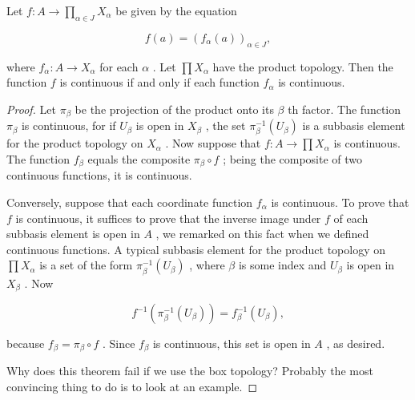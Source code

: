 \begin{theorem} Let \(f : A \rightarrow  \mathop{\prod }\limits_{{\alpha  \in  J}}{X}_{\alpha }\) be given by the equation

\[
f\left( a\right)  = {\left( {f}_{\alpha }\left( a\right) \right) }_{\alpha  \in  J},
\]

where \({f}_{\alpha } : A \rightarrow  {X}_{\alpha }\) for each \(\alpha\) . Let \(\prod {X}_{\alpha }\) have the product topology. Then the function \(f\) is continuous if and only if each function \({f}_{\alpha }\) is continuous.

\end{theorem}
\begin{proof}
Let \({\pi }_{\beta }\) be the projection of the product onto its \(\beta\) th factor. The function \({\pi }_{\beta }\) is continuous, for if \({U}_{\beta }\) is open in \({X}_{\beta }\) , the set \({\pi }_{\beta }^{-1}\left( {U}_{\beta }\right)\) is a subbasis element for the product topology on \({X}_{\alpha }\) . Now suppose that \(f : A \rightarrow  \prod {X}_{\alpha }\) is continuous. The function \({f}_{\beta }\) equals the composite \({\pi }_{\beta } \circ  f\) ; being the composite of two continuous functions, it is continuous.

Conversely, suppose that each coordinate function \({f}_{\alpha }\) is continuous. To prove that \(f\) is continuous, it suffices to prove that the inverse image under \(f\) of each subbasis element is open in \(A\) , we remarked on this fact when we defined continuous functions. A typical subbasis element for the product topology on \(\prod {X}_{\alpha }\) is a set of the form \({\pi }_{\beta }^{-1}\left( {U}_{\beta }\right)\) , where \(\beta\) is some index and \({U}_{\beta }\) is open in \({X}_{\beta }\) . Now

\[
{f}^{-1}\left( {{\pi }_{\beta }^{-1}\left( {U}_{\beta }\right) }\right)  = {f}_{\beta }^{-1}\left( {U}_{\beta }\right) ,
\]

because \({f}_{\beta } = {\pi }_{\beta } \circ  f\) . Since \({f}_{\beta }\) is continuous, this set is open in \(A\) , as desired.

Why does this theorem fail if we use the box topology? Probably the most convincing thing to do is to look at an example.
\end{proof}

